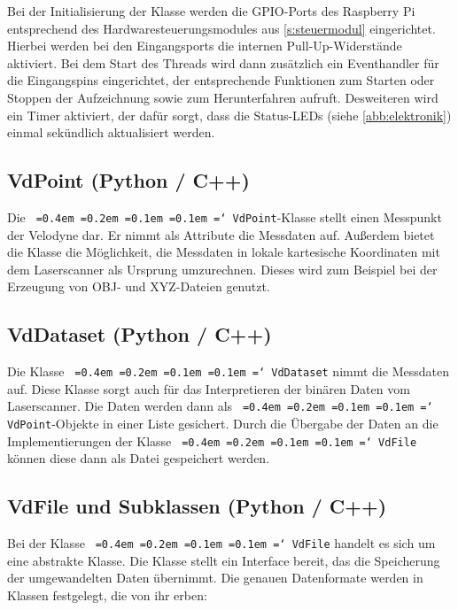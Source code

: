 \documentclass[a4paper,12pt,bibliography=totoc, listof=totoc,titlepage,pointlessnumbers]{scrreprt}
\newcommand*\justify{%
  \fontdimen2\font=0.4em%
  \fontdimen3\font=0.2em%
  \fontdimen4\font=0.1em%
  \fontdimen7\font=0.1em%
  \hyphenchar\font=`\-%
}
\newcommand{\code}[1]{\texttt{\justify{#1}}}
\begin{document}
Bei der Initialisierung der Klasse werden die GPIO-Ports des Rasp\-berry Pi entsprechend des Hardwaresteuerungsmodules aus \autoref{s:steuermodul} eingerichtet. Hierbei werden bei den Eingangsports die internen Pull-Up-Widerstände aktiviert. Bei dem Start des Threads wird dann zusätzlich ein Eventhandler für die Eingangspins eingerichtet, der entsprechende Funktionen zum Starten oder Stoppen der Aufzeichnung sowie zum Herunterfahren aufruft. Desweiteren wird ein Timer aktiviert, der dafür sorgt, dass die Status-LEDs (siehe \autoref{abb:elektronik}) einmal sekündlich aktualisiert werden.

\subsection{VdPoint (Python / C++)}
Die \code{VdPoint}-Klasse stellt einen Messpunkt der Velodyne dar. Er nimmt als Attribute die Messdaten auf. Außerdem bietet die Klasse die Möglichkeit, die Messdaten in lokale kartesische Koordinaten mit dem Laser\-scan\-ner als Ursprung umzurechnen. Dieses wird zum Beispiel bei der Erzeugung von OBJ- und XYZ-Dateien genutzt.

\subsection{VdDataset (Python / C++)}
Die Klasse \code{VdDataset} nimmt die Messdaten auf. Diese Klasse sorgt auch für das Interpretieren der binären Daten vom Laser\-scan\-ner. Die Daten werden dann als \code{VdPoint}-Objekte in einer Liste gesichert. Durch die Übergabe der Daten an die Implementierungen der Klasse \code{VdFile} können diese dann als Datei gespeichert werden.

\subsection{VdFile und Subklassen (Python / C++)}
Bei der Klasse \code{VdFile} handelt es sich um eine abstrakte Klasse. Die Klasse stellt ein Interface bereit, das die Speicherung der umgewandelten Daten übernimmt. Die genauen Datenformate werden in Klassen festgelegt, die von ihr erben:
\end{document}

